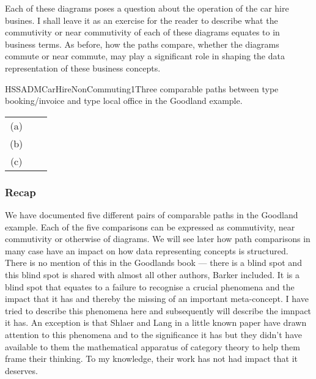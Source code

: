 Each of these diagrams poses a question about the operation of the car hire busines.
I shall leave it as
an exercise for the reader to describe what the commutivity or near commutivity of each of these diagrams equates to in business terms.
As before, how the paths compare, whether the diagrams commute or near commute, may play a significant role in  shaping the data representation of these business concepts.

\begin{erboxedFigure}{H}{SSADMCarHireNonCommuting1}{Three comparable paths between type booking/invoice and type local office in the Goodland example. }
\begin{tabular}{c p{1cm} c}
(a) &&  \\
(b) &&  \\
(c) && 
\end{tabular}
\end{erboxedFigure}

\subsubsection{Recap}
We have documented five different pairs of comparable paths in the Goodland example. 
Each of the five comparisons can be expressed as commutivity, near commutivity or otherwise of diagrams. We will see later how path comparisons in many case have an impact on how data representing concepts is structured. There is no mention of this in the Goodlands book --- there is a blind spot and this
blind spot is shared with almost all other authors, Barker included. 
It is a blind spot that equates to a failure to recognise a crucial phenomena and the impact that it has 
and thereby the missing of an important meta-concept. 
I have tried to describe this phenomena here and subsequently will describe the imnpact it has.
An exception is that  Shlaer and Lang in a little known paper have drawn attention to this phenomena
and to the significance it has but they didn't have 
 available to them the mathematical apparatus of category theory to help them frame their thinking. 
To my knowledge, their work has not had impact that it deserves. 
